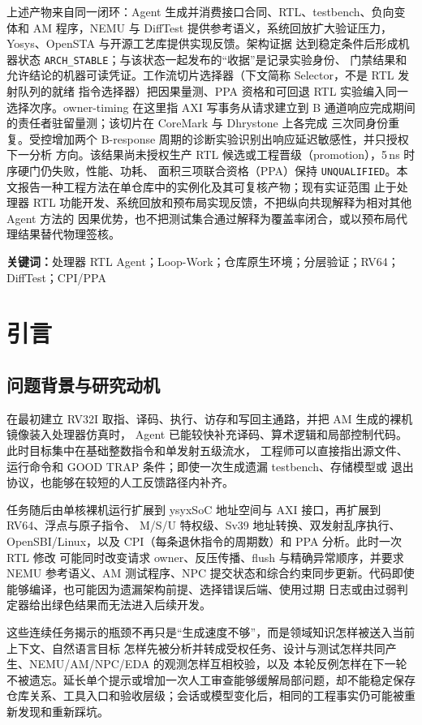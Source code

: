 \documentclass[UTF8,a4paper,zihao=-4,oneside]{ctexart}
\newcommand{\statusword}[1]{\texttt{#1}}
\begin{document}
上述产物来自同一闭环：Agent 生成并消费接口合同、RTL、testbench、负向变体和 AM 程序，NEMU 与
DiffTest 提供参考语义，系统回放扩大验证压力，Yosys、OpenSTA 与开源工艺库提供实现反馈。架构证据
达到稳定条件后形成机器状态 \statusword{ARCH\_STABLE}；与该状态一起发布的“收据”是记录实验身份、
门禁结果和允许结论的机器可读凭证。工作流切片选择器（下文简称 Selector，不是 RTL 发射队列的就绪
指令选择器）把因果量测、PPA 资格和可回退 RTL 实验编入同一选择次序。owner-timing 在这里指 AXI
写事务从请求建立到 B 通道响应完成期间的责任者驻留量测；该切片在 CoreMark 与 Dhrystone 上各完成
三次同身份重复。受控增加两个 B-response 周期的诊断实验识别出响应延迟敏感性，并只授权下一分析
方向。该结果尚未授权生产 RTL 候选或工程晋级（promotion），5\,ns 时序硬门仍失败，性能、功耗、
面积三项联合资格（PPA）保持
\statusword{UNQUALIFIED}。本文报告一种工程方法在单仓库中的实例化及其可复核产物；现有实证范围
止于处理器 RTL 功能开发、系统回放和预布局实现反馈，不把纵向共现解释为相对其他 Agent 方法的
因果优势，也不把测试集合通过解释为覆盖率闭合，或以预布局代理结果替代物理签核。

\vspace{0.4em}
\noindent\textbf{关键词：}处理器 RTL Agent；Loop-Work；仓库原生环境；分层验证；RV64；DiffTest；CPI/PPA

\section{引言}

\subsection{问题背景与研究动机}

在最初建立 RV32I 取指、译码、执行、访存和写回主通路，并把 AM 生成的裸机镜像装入处理器仿真时，
Agent 已能较快补充译码、算术逻辑和局部控制代码。此时目标集中在基础整数指令和单发射五级流水，
工程师可以直接指出源文件、运行命令和 GOOD TRAP 条件；即使一次生成遗漏 testbench、存储模型或
退出协议，也能够在较短的人工反馈路径内补齐。

任务随后由单核裸机运行扩展到 ysyxSoC 地址空间与 AXI 接口，再扩展到 RV64、浮点与原子指令、
M/S/U 特权级、Sv39 地址转换、双发射乱序执行、OpenSBI/Linux，以及 CPI（每条退休指令的周期数）和
PPA 分析。此时一次 RTL 修改
可能同时改变请求 owner、反压传播、flush 与精确异常顺序，并要求 NEMU 参考语义、AM 测试程序、NPC
提交状态和综合约束同步更新。代码即使能够编译，也可能因为遗漏架构前提、选择错误后端、使用过期
日志或由过弱判定器给出绿色结果而无法进入后续开发。

这些连续任务揭示的瓶颈不再只是“生成速度不够”，而是领域知识怎样被送入当前上下文、自然语言目标
怎样先被分析并转成受权任务、设计与测试怎样共同产生、NEMU/AM/NPC/EDA 的观测怎样互相校验，以及
本轮反例怎样在下一轮不被遗忘。延长单个提示或增加一次人工审查能够缓解局部问题，却不能稳定保存
仓库关系、工具入口和验收层级；会话或模型变化后，相同的工程事实仍可能被重新发现和重新踩坑。
\end{document}
